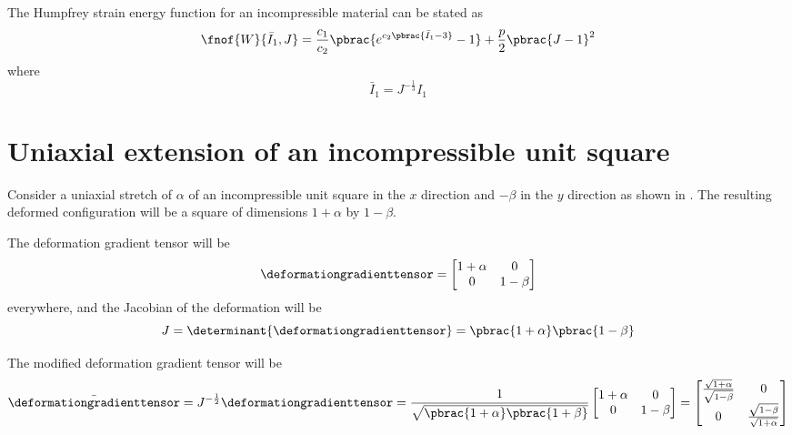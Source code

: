 The Humpfrey strain energy function for an incompressible material can be
stated as
\begin{equation}
  \fnof{W}{\bar{I}_{1},J}=\dfrac{c_{1}}{c_{2}}\pbrac{e^{c_{2}\pbrac{\bar{I}_{1}-3}}-1}+\dfrac{p}{2}\pbrac{J-1}^{2}
\end{equation}
where
\begin{equation}
  \bar{I}_{1}=J^{-\frac{1}{3}}I_{1}
\end{equation}

\clearemptydoublepage

\section{Uniaxial extension of an incompressible unit square}

Consider a uniaxial stretch of $\alpha$ of an incompressible unit
square in the $x$ direction and $-\beta$ in the $y$ direction as shown
in . The resulting deformed
configuration will be a square of dimensions $1+\alpha$ by $1-\beta$.


The deformation gradient tensor will be
\begin{equation}
  \deformationgradienttensor= \begin{bmatrix}
    1+\alpha & 0  \\
    0 & 1-\beta
  \end{bmatrix}
\end{equation}
everywhere, and the Jacobian of the deformation will be 
\begin{equation}
  J = \determinant{\deformationgradienttensor}=\pbrac{1+\alpha}\pbrac{1-\beta}
\end{equation}

The modified deformation gradient tensor will be
\begin{equation}
  \bar{\deformationgradienttensor}=J^{-\frac{1}{2}}\deformationgradienttensor=\frac{1}{\sqrt{\pbrac{1+\alpha}\pbrac{1+\beta}}}\begin{bmatrix}
    1+\alpha & 0  \\
    0 & 1-\beta
  \end{bmatrix}=\begin{bmatrix}
    \frac{\sqrt{1+\alpha}}{\sqrt{1-\beta}} & 0  \\
    0 & \frac{\sqrt{1-\beta}}{\sqrt{1+\alpha}}
  \end{bmatrix}
\end{equation}

